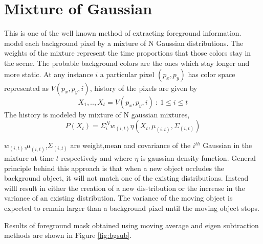 \documentclass[MTech]{iitmdiss}
\begin{document}
\section{Mixture of Gaussian}
This is one of the well known method of extracting foreground information. \cite{kaew} model each background pixel by a mixture of N Gaussian distributions. The weights of the mixture represent the time proportions that those colors stay in the scene. The probable background colors are the ones which stay longer and more static. At any instance $i$ a particular pixel $(p_x,p_y)$ has color space represented as $V(p_{x},p_{y},i)$, history of the pixels are given by 
$$X_{1},..,X_{t} = {V(p_{x},p_{y},i)~:~1\le i \le t }$$
The history is modeled by mixture of N gaussian mixtures,
$$P(X_{t})=\Sigma_{i}^{N}w_{(i,t)}\eta(X_{t},\mu_{(i,t)},\Sigma_{(i,t)})$$
\par $w_{(i,t)}$,$\mu_{(i,t)}$,$\Sigma_{(i,t)}$ are weight,mean and covariance of the $i^{th}$ Gaussian in the mixture at time $t$ respectively and where $\eta$ is gaussian density function. General principle behind this approach is that when a new object occludes the background object, it will not match one of the existing distributions. Instead willl result in either the creation of a new dis-tribution or the increase in the variance of an existing distribution. The variance of the moving object is expected to remain larger than a background pixel until the moving object stops.

\par Results of foreground mask obtained using moving average and eigen subtraction methods are shown in Figure \ref{fig:bgsub}.
\end{document}
